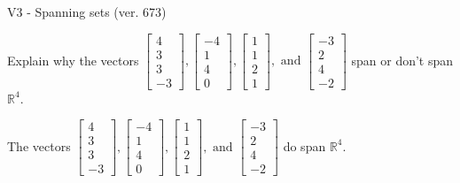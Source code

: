 \begin{exercise}
  \begin{exerciseTitle}V3 - Spanning sets (ver. 673)\end{exerciseTitle}
  \begin{exerciseStatement}
    Explain why the vectors \(\left[\begin{array}{r}
4 \\
3 \\
3 \\
-3
\end{array}\right] , \left[\begin{array}{r}
-4 \\
1 \\
4 \\
0
\end{array}\right] , \left[\begin{array}{r}
1 \\
1 \\
2 \\
1
\end{array}\right] , \text{ and } \left[\begin{array}{r}
-3 \\
2 \\
4 \\
-2
\end{array}\right]\) span or don't span \(\mathbb{R}^4\). 
	


  \end{exerciseStatement}
  \begin{exerciseAnswer}
   The vectors \(\left[\begin{array}{r}
4 \\
3 \\
3 \\
-3
\end{array}\right] , \left[\begin{array}{r}
-4 \\
1 \\
4 \\
0
\end{array}\right] , \left[\begin{array}{r}
1 \\
1 \\
2 \\
1
\end{array}\right] , \text{ and } \left[\begin{array}{r}
-3 \\
2 \\
4 \\
-2
\end{array}\right]\) 
  	 do  
	span \(\mathbb{R}^4\).
  


  \end{exerciseAnswer}
\end{exercise}